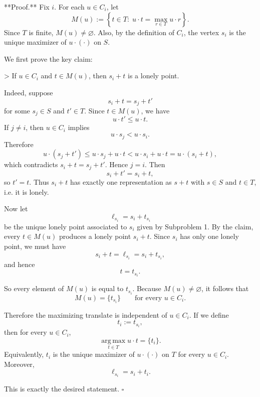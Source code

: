 **Proof.** Fix \(i\). For each \(u\in C_i\), let
\[
M(u):=\left\{t\in T:\; u\cdot t=\max_{r\in T} u\cdot r\right\}.
\]
Since \(T\) is finite, \(M(u)\neq\varnothing\). Also, by the definition of \(C_i\), the vertex \(s_i\) is the unique maximizer of \(u\cdot(\cdot)\) on \(S\).

We first prove the key claim:

> If \(u\in C_i\) and \(t\in M(u)\), then \(s_i+t\) is a lonely point.

Indeed, suppose
\[
s_i+t=s_j+t'
\]
for some \(s_j\in S\) and \(t'\in T\). Since \(t\in M(u)\), we have
\[
u\cdot t' \le u\cdot t.
\]
If \(j\neq i\), then \(u\in C_i\) implies
\[
u\cdot s_j<u\cdot s_i.
\]
Therefore
\[
u\cdot(s_j+t')
\le u\cdot s_j+u\cdot t
< u\cdot s_i+u\cdot t
= u\cdot(s_i+t),
\]
which contradicts \(s_i+t=s_j+t'\). Hence \(j=i\). Then
\[
s_i+t'=s_i+t,
\]
so \(t'=t\). Thus \(s_i+t\) has exactly one representation as \(s+t\) with \(s\in S\) and \(t\in T\), i.e. it is lonely.

Now let
\[
\ell_{s_i}=s_i+t_{s_i}
\]
be the unique lonely point associated to \(s_i\) given by Subproblem 1. By the claim, every \(t\in M(u)\) produces a lonely point \(s_i+t\). Since \(s_i\) has only one lonely point, we must have
\[
s_i+t=\ell_{s_i}=s_i+t_{s_i},
\]
and hence
\[
t=t_{s_i}.
\]

So every element of \(M(u)\) is equal to \(t_{s_i}\). Because \(M(u)\neq\varnothing\), it follows that
\[
M(u)=\{t_{s_i}\}
\qquad\text{for every }u\in C_i.
\]

Therefore the maximizing translate is independent of \(u\in C_i\). If we define
\[
t_i:=t_{s_i},
\]
then for every \(u\in C_i\),
\[
\operatorname*{arg\,max}_{t\in T} u\cdot t=\{t_i\}.
\]
Equivalently, \(t_i\) is the unique maximizer of \(u\cdot(\cdot)\) on \(T\) for every \(u\in C_i\). Moreover,
\[
\ell_{s_i}=s_i+t_i.
\]

This is exactly the desired statement. \(\square\)